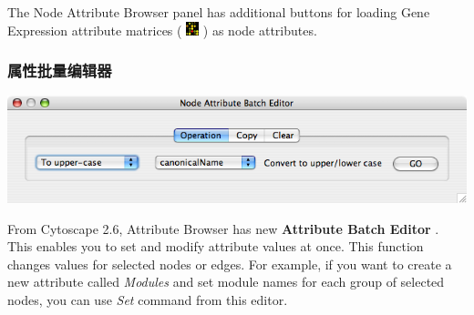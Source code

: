 The Node Attribute Browser panel has additional buttons for loading Gene
Expression attribute matrices (
\includegraphics[width=1em]{images/attributes_gene_expr_icon.png}  ) as node
attributes. 

\subsubsection{属性批量编辑器}
\includegraphics[width=.5\textwidth]{images/attribute_editor26.png} 

From Cytoscape 2.6, Attribute Browser has new \textbf{Attribute Batch Editor}
. This enables you to set and modify attribute values at once. This function
changes values for selected nodes or edges. For example, if you want to create
a new attribute called \emph{Modules} and set module names for each group of
selected nodes, you can use \emph{Set} command from this editor. 

